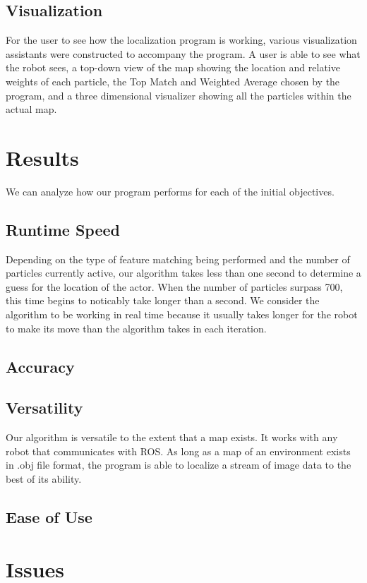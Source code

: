 \documentclass[a4paper,11pt]{article}
\begin{document}
\subsection{Visualization}
For the user to see how the localization program is working, various visualization assistants were constructed to accompany the program. A user is able to see what the robot sees, a top-down view of the map showing the location and relative weights of each particle, the Top Match and Weighted Average chosen by the program, and a three dimensional visualizer showing all the particles within the actual map.

\section{Results}
We can analyze how our program performs for each of the initial objectives.

\subsection{Runtime Speed}
Depending on the type of feature matching being performed and the number of particles currently active, our algorithm takes less than one second to determine a guess for the location of the actor. When the number of particles surpass 700, this time begins to noticably take longer than a second. We consider the algorithm to be working in real time because it usually takes longer for the robot to make its move than the algorithm takes in each iteration.

\subsection{Accuracy}


\subsection{Versatility}
Our algorithm is versatile to the extent that a map exists. It works with any robot that communicates with ROS. As long as a map of an environment exists in .obj file format, the program is able to localize a stream of image data to the best of its ability.

\subsection{Ease of Use}


\section{Issues}
\end{document}

